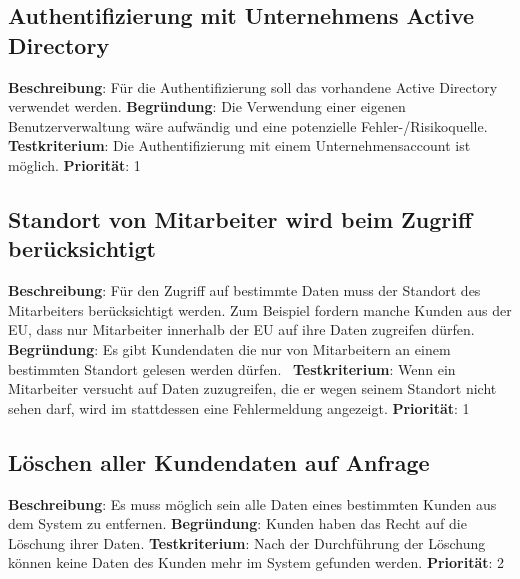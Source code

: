 \subsection{Authentifizierung mit Unternehmens Active Directory} \label{sec:anforderungsspezifikation:SAG_AD}
\textbf{Beschreibung}: Für die Authentifizierung soll das vorhandene Active Directory verwendet werden.
\newline \textbf{Begründung}: Die Verwendung einer eigenen Benutzerverwaltung wäre aufwändig und eine potenzielle Fehler-/Risikoquelle.
\newline \textbf{Testkriterium}: Die Authentifizierung mit einem Unternehmensaccount ist möglich.
\newline \textbf{Priorität}: 1

\subsection{Standort von Mitarbeiter wird beim Zugriff berücksichtigt} \label{sec:anforderungsspezifikation:}
\textbf{Beschreibung}: Für den Zugriff auf bestimmte Daten muss der Standort des Mitarbeiters berücksichtigt werden. Zum Beispiel fordern manche Kunden aus der EU, dass nur Mitarbeiter innerhalb der EU auf ihre Daten zugreifen dürfen.
\newline \textbf{Begründung}: Es gibt Kundendaten die nur von Mitarbeitern an einem bestimmten Standort gelesen werden dürfen. 
\newline \textbf{Testkriterium}: Wenn ein Mitarbeiter versucht auf Daten zuzugreifen, die er wegen seinem Standort nicht sehen darf, wird im stattdessen eine Fehlermeldung angezeigt.
\newline \textbf{Priorität}: 1

\subsection{Löschen aller Kundendaten auf Anfrage} \label{sec:anforderungsspezifikation:löschenKundendaten}
\textbf{Beschreibung}: Es muss möglich sein alle Daten eines bestimmten Kunden aus dem System zu entfernen.
\newline \textbf{Begründung}: Kunden haben das Recht auf die Löschung ihrer Daten.
\newline \textbf{Testkriterium}: Nach der Durchführung der Löschung können keine Daten des Kunden mehr im System gefunden werden.
\newline \textbf{Priorität}: 2

